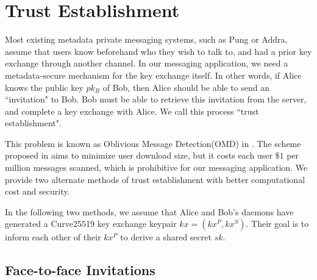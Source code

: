 \section{Trust Establishment}
\label{sec:trustestablishment}

Most existing metadata private messaging systems, such as Pung or Addra, assume that users know beforehand who they wish to talk to, and had a prior key exchange through another channel. 
In our messaging application, we need a metadata-secure mechanism for the key exchange itself. 
In other words, if Alice knows the public key $pk_B$ of Bob, then Alice should be able to send an ``invitation" to Bob. 
Bob must be able to retrieve this invitation from the server, and complete a key exchange with Alice. We call this process ``trust establishment".

This problem is known as Oblivious Message Detection(OMD) in \cite{liutromer2021}. The scheme proposed in \cite{liutromer2021} aims to minimize user download size, but it costs each user $\$ 1$ per million messages scanned, which is prohibitive for our messaging application. We provide two alternate methods of trust establishment with better computational cost and security.

In the following two methods, we assume that Alice and Bob's daemons have generated a Curve25519 key exchange keypair $kx = (kx^P, kx^S)$. Their goal is to inform each other of their $kx^P$ to derive a shared secret $sk$.

\subsection{Face-to-face Invitations}


